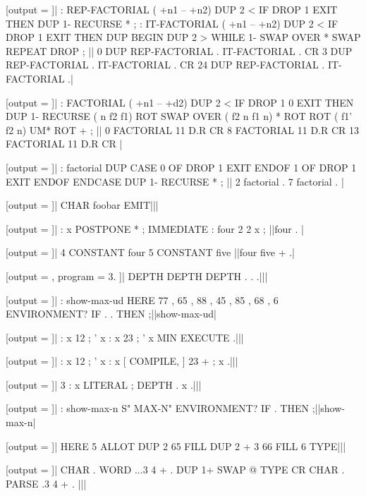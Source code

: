 [output = \result]|
  : REP-FACTORIAL ( +n1 -- +n2)
  DUP 2 < IF DROP 1 EXIT THEN
  DUP 1- RECURSE *
  ;
  : IT-FACTORIAL ( +n1 -- +n2)
  DUP 2 < IF DROP 1 EXIT THEN
  DUP
  BEGIN DUP 2 > WHILE
  1- SWAP OVER * SWAP
  REPEAT DROP
  ;
||
0 DUP REP-FACTORIAL . IT-FACTORIAL . CR
3 DUP REP-FACTORIAL . IT-FACTORIAL . CR
24 DUP REP-FACTORIAL . IT-FACTORIAL .|
\typeout{\result}

[output = \result]|
  : FACTORIAL ( +n1 -- +d2)
  DUP 2 < IF DROP 1 0 EXIT THEN
  DUP 1- RECURSE ( n f2 f1)
  ROT SWAP OVER ( f2 n f1 n)
  * ROT ROT ( f1' f2 n)
  UM* ROT +
  ;
||
0  FACTORIAL 11 D.R CR
8  FACTORIAL 11 D.R CR
13 FACTORIAL 11 D.R CR
|
\typeout{\result}

[output = \result]|
  : factorial DUP
  CASE
    0 OF DROP 1 EXIT ENDOF
    1 OF DROP 1 EXIT ENDOF
  ENDCASE
  DUP 1- RECURSE * ;
||
  2 factorial .
  7 factorial .
|
\typeout{\result}

[output = \result]|
  CHAR foobar EMIT|||
\typeout{\result}

[output = \result]|
  : x POSTPONE * ; IMMEDIATE
  : four 2 2 x ;
||four . |
\typeout{\result}

[output = \result]|
  4 CONSTANT four
  5 CONSTANT five
||four five + .|
\typeout{\result}

[output = \result, program = { 3\space . }]|
  DEPTH DEPTH DEPTH . . .|||
\typeout{\result}

[output = \result]|
  : show-max-ud HERE 77 , 65 , 88 , 45 , 85 , 68 ,
    6 ENVIRONMENT? IF . . THEN ;||show-max-ud|
\typeout{\result}

[output = \result]|
  : x 12 ; ' x
  : x 23 ; ' x
  MIN EXECUTE .|||
\typeout{\result}

[output = \result]|
  : x 12 ; ' x
  : x [ COMPILE, ] 23 + ; x .|||
\typeout{\result}

[output = \result]|
  3 : x LITERAL ; DEPTH . x .|||
\typeout{\result}

[output = \result]|
  : show-max-n S" MAX-N" ENVIRONMENT? IF . THEN ;||show-max-n|
\typeout{\result}

[output = \result]|
  HERE 5 ALLOT
  DUP 2 65 FILL
  DUP 2 + 3 66 FILL
  6 TYPE|||
\typeout{\result}

[output = \result]|
  CHAR . WORD ...3 4 + . DUP 1+ SWAP @ TYPE CR
  CHAR . PARSE .3 4 + .
|||
\typeout{\result}

